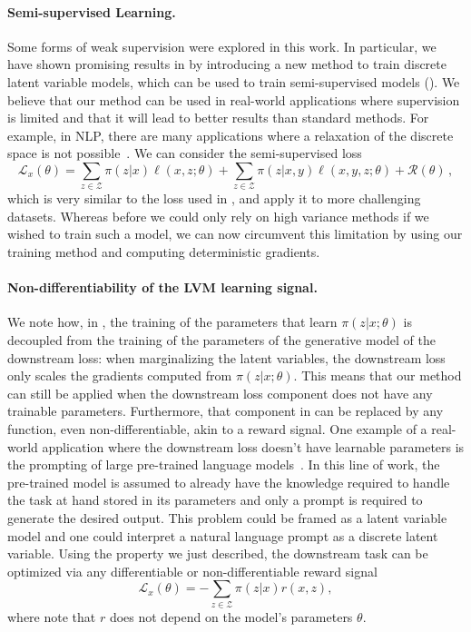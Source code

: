 \paragraph*{Semi-supervised Learning.} Some forms of weak
supervision were explored in this work. In particular, we have shown
promising results in  by introducing a new
method to train discrete latent variable models, which can be used to
train semi-supervised models (). We believe that our
method can be used in real-world applications where supervision is
limited and that it will lead to better results than standard
methods. For example, in NLP, there are many applications where a
relaxation of the discrete space is not possible~\citep{Lee2019}.
We can consider the semi-supervised loss
%
\begin{equation}
    \mathcal{L}_{x}(\theta) =
    \sum_{z \in \mathcal{Z}} \pi(z | x) \ell(x, z; \theta)
    + \sum_{z \in \mathcal{Z}} \pi(z | x, y) \ell(x, y, z; \theta)
    + \mathcal{R}(\theta)\,,
\end{equation}
%
which is very similar to the loss used in ,
and apply it to more challenging datasets.
Whereas before we could only rely on high variance methods if we wished to
train such a model, we can now circumvent this limitation
by using our training method and computing deterministic gradients.

\paragraph*{Non-differentiability of the LVM learning signal.} We
note how, in , the training of the parameters that
learn $\pi(z|x;\theta)$ is decoupled from the training of the
parameters of the generative model of the downstream loss: when
marginalizing the latent variables, the downstream loss only scales
the gradients computed from $\pi(z|x;\theta)$. This means that our
method can still be applied when the downstream loss component does
not have any trainable parameters. Furthermore, that component in
 can be replaced by any function, even
non-differentiable, akin to a reward signal. One example of a
real-world application where the downstream loss doesn't have
learnable parameters is the prompting of large pre-trained language
models~\citep{liu2021PretrainPromptPredict}. In this line of work,
the pre-trained model is assumed to already have the knowledge
required to handle the task at hand stored in its parameters and only
a prompt is required to generate the desired output. This problem
could be framed as a latent variable model and one could interpret a
natural language prompt as a discrete latent variable. Using the
property we just described, the downstream task can be optimized via
any differentiable or non-differentiable reward signal
%
\begin{equation}
    \mathcal{L}_{x}(\theta) =
    - \sum_{z \in \mathcal{Z}} \pi(z | x) r(x, z),
\end{equation}
%
where note that $r$ does not depend on the model's parameters $\theta$.

